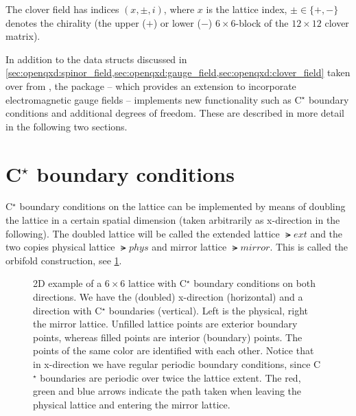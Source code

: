 The clover field has indices $(x, \pm, i)$, where $x$ is the lattice index, $\pm \in \{+, -\}$ denotes the chirality (\ie the upper ($+$) or lower ($-$) $6 \times 6$-block of the $12 \times 12$ clover matrix).



In addition to the data structs discussed in \cref{sec:openqxd:spinor_field,sec:openqxd:gauge_field,sec:openqxd:clover_field} taken over from \openqcd, the \openqxd package -- which provides an extension to incorporate electromagnetic gauge fields -- implements new functionality such as C$^\star$ boundary conditions and additional degrees of freedom.
These are described in more detail in the following two sections.

\section{C\texorpdfstring{$^{\star}$}{*} boundary conditions}
\label{sec:openqxd:cstar_bcs}

C$^{\star}$ boundary conditions on the lattice can be implemented by means of doubling the lattice in a certain spatial dimension (taken arbitrarily as x-direction in the following).
The doubled lattice will be called the extended lattice $\lat{ext}$ and the two copies physical lattice $\lat{phys}$ and mirror lattice $\lat{mirror}$.
This is called the orbifold construction, see \cref{fig:cstar:orbi}.
\begin{figure}
  
  \caption{2D example of a $6 \times 6$ lattice with C$^\star$ boundary conditions on both directions. We have the (doubled) x-direction (horizontal) and a direction with C$^\star$ boundaries (vertical). Left is the physical, right the mirror lattice. Unfilled lattice points are exterior boundary points, whereas filled points are interior (boundary) points. The points of the same color are identified with each other. Notice that in x-direction we have regular periodic boundary conditions, since C$^\star$ boundaries are periodic over twice the lattice extent. The red, green and blue arrows indicate the path taken when leaving the physical lattice and entering the mirror lattice.}
  \label{fig:cstar:orbi}
\end{figure}

